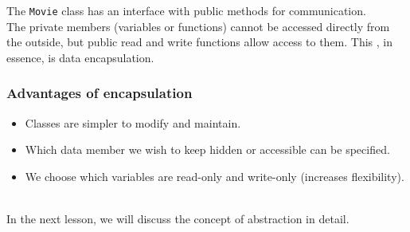 The \texttt{Movie} class has an interface with public methods for communication.
\\
The private members (variables or functions) cannot be accessed directly from the outside, but public read and write functions allow access to them. This , in essence, is data encapsulation.

\subsubsection{Advantages of encapsulation}\label{3JkU4uIRsnpz-lwJ0zusw}

\begin{itemize}
\item
\protect{}\label{tFJ0oWJIOhnT7Xl6knYLW}
Classes are simpler to modify and maintain.
\item
\protect{}\label{8AU5OUafN-DE7eA4kyZNk}
Which data member we wish to keep hidden or accessible can be specified.
\item
\protect{}\label{Q8G8V-5w0oNDGonwdu4FD}
We choose which variables are read-only and write-only (increases flexibility).
\end{itemize}
\\
In the next lesson, we will discuss the concept of abstraction in detail.

